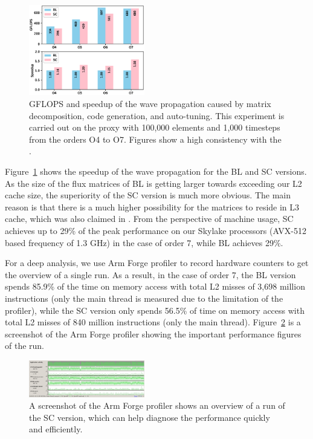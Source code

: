 \documentclass[5p,times]{sig-alternate-05-2015}
\begin{document}
\begin{figure}[!ht]
	\centering
	\includegraphics[width=0.45\textwidth]{singlenode.eps}
	\caption{GFLOPS and speedup of the wave propagation caused by matrix decomposition, code generation, and auto-tuning. This experiment is carried out on the proxy with 100,000 elements and 1,000 timesteps from the orders O4 to O7. Figures show a high consistency with the \OriginalPaper.}
	\label{fig:single}
\end{figure}

Figure~\ref{fig:single} shows the speedup of the wave propagation for the BL and SC versions. As the size of the flux matrices of BL is getting larger towards exceeding our L2 cache size, the superiority of the SC version is much more obvious. The main reason is that there is a much higher possibility for the matrices to reside in L3 cache, which was also claimed in \OriginalPaper. From the perspective of machine usage, SC achieves up to 29\% of the peak performance on our Skylake processors (AVX-512 based frequency of 1.3 GHz) in the case of order 7, while BL achieves 29\%.

For a deep analysis, we use Arm Forge profiler to record hardware counters to get the overview of a single run. As a result, in the case of order 7, the BL version spends 85.9\% of the time on memory access with total L2 misses of 3,698 million instructions (only the main thread is measured due to the limitation of the profiler), while the SC version only spends 56.5\% of time on memory access with total L2 misses of 840 million instructions (only the main thread). Figure~\ref{fig:arm} is a screenshot of the Arm Forge profiler showing the important performance figures of the run.

\begin{figure}[!ht]
	\centering
	\includegraphics[width=0.45\textwidth]{arm.png}
	\caption{A screenshot of the Arm Forge profiler shows an overview of a run of the SC version, which can help diagnose the performance quickly and efficiently.}
	\label{fig:arm}
\end{figure}
\end{document}
